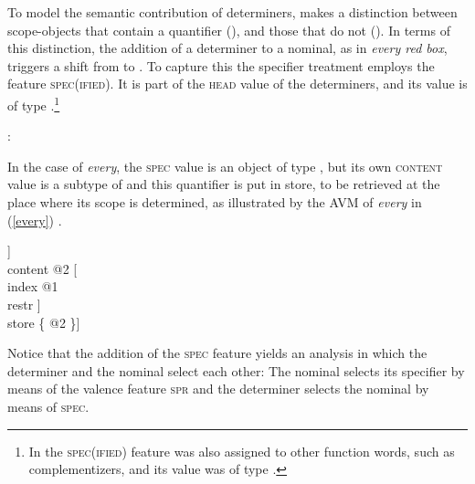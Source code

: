 \documentclass[output=paper
                ,modfonts
                ,nonflat
	        ,collection
	        ,collectionchapter
	        ,collectiontoclongg
 	        ,biblatex
                ,babelshorthands
                ,newtxmath
                ,draftmode
                ,colorlinks, citecolor=brown
]{./langsci/langscibook}
\begin{document}
To model the semantic contribution of determiners, \citet{GS00} 
makes a distinction between scope-objects that contain a quantifier 
(), and those that do not (). 
In terms of this distinction, the 
addition of a determiner to a nominal, as in \emph{every red box}, 
triggers a shift from  to . 
To capture this the specifier treatment employs the feature \textsc{spec(ified)}. 
It is part of the \textsc{head} value of the determiners, and its value is of type 
.\footnote{In \citet[45]{ps2} the \textsc{spec(ified)}
feature was also assigned to other function words, such as complementizers, 
and its value was of type .}   

\begin{exe} 
\ex   {}: \begin{avm}  \end{avm}  
\end{exe} 

\noindent
In the case of \emph{every}, the \textsc{spec} value is an object of 
type , but its own \textsc{content} value is a subtype of 
 and this quantifier is put in store, to be retrieved 
at the place where its scope is determined, as illustrated by the AVM
of \emph{every} in (\ref{every}) \citep[204]{GS00}.  

\begin{exe} 
\ex\label{every} 
\begin{avm}
[cat|head [\type{det}               \\
           spec [\type{parameter}   \\
                 index @1          \\
                 restr \avmbox{$\Sigma$} ]] \\
 content @2 [     \\
               index @1            \\
               restr \avmbox{$\Sigma$} ] \\
 store \{ @2 \}]
\end{avm}
\end{exe}

\noindent 
Notice that the addition of the \textsc{spec} feature yields an analysis in which the determiner 
and the nominal select each other: The nominal selects 
its specifier by means of the valence feature \textsc{spr} and the determiner selects the nominal 
by means of \textsc{spec}.  
\end{document}
